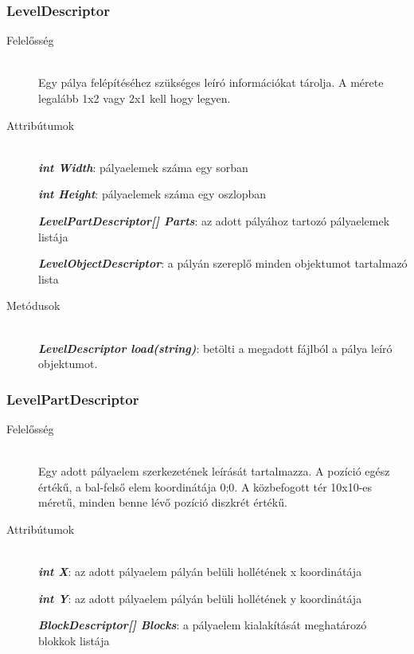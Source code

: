 \subsubsection{LevelDescriptor}
	\begin{description}
		\item[Felelősség] \hfill \\
		Egy pálya felépítéséhez szükséges leíró információkat tárolja. A mérete legalább 1x2 vagy 2x1 kell hogy legyen.
		
		\item[Attribútumok]\hfill \\
		\textbf{\emph{int Width}}: pályaelemek száma egy sorban
		
		\textbf{\emph{int Height}}: pályaelemek száma egy oszlopban
		
		\textbf{\emph{LevelPartDescriptor[] Parts}}: az adott pályához tartozó pályaelemek listája
		
		\textbf{\emph{LevelObjectDescriptor}}: a pályán szereplő minden objektumot tartalmazó lista
				
		\item[Metódusok]\hfill \\
		\textbf{\emph{LevelDescriptor load(string)}}: betölti a megadott fájlból a pálya leíró objektumot.
						
	\end{description}

\subsubsection{LevelPartDescriptor}
	\begin{description}
		\item[Felelősség] \hfill \\
		Egy adott pályaelem szerkezetének leírását tartalmazza. A pozíció egész értékű, a bal-felső elem koordinátája 0;0. A közbefogott tér 10x10-es méretű, minden benne lévő pozíció diszkrét értékű.
		
		\item[Attribútumok]\hfill \\
		\textbf{\emph{int X}}: az adott pályaelem pályán belüli hollétének x koordinátája
		
		\textbf{\emph{int Y}}: az adott pályaelem pályán belüli hollétének y koordinátája
		
		\textbf{\emph{BlockDescriptor[] Blocks}}: a pályaelem kialakítását meghatározó blokkok listája
	\end{description}
	
